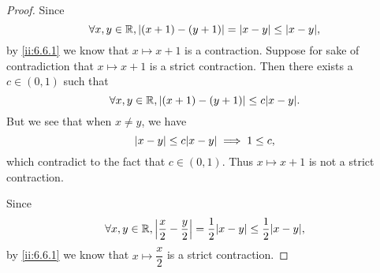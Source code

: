 \begin{proof}
  Since
  \[
    \forall x, y \in \R, \abs{(x + 1) - (y + 1)} = \abs{x - y} \leq \abs{x - y},
  \]
  by \cref{ii:6.6.1} we know that \(x \mapsto x + 1\) is a contraction.
  Suppose for sake of contradiction that \(x \mapsto x + 1\) is a strict contraction.
  Then there exists a \(c \in (0, 1)\) such that
  \[
    \forall x, y \in \R, \abs{(x + 1) - (y + 1)} \leq c \abs{x - y}.
  \]
  But we see that when \(x \neq y\), we have
  \[
    \abs{x - y} \leq c \abs{x - y} \implies 1 \leq c,
  \]
  which contradict to the fact that \(c \in (0, 1)\).
  Thus \(x \mapsto x + 1\) is not a strict contraction.

  Since
  \[
    \forall x, y \in \R, \abs{\dfrac{x}{2} - \dfrac{y}{2}} = \dfrac{1}{2} \abs{x - y} \leq \dfrac{1}{2} \abs{x - y},
  \]
  by \cref{ii:6.6.1} we know that \(x \mapsto \dfrac{x}{2}\) is a strict contraction.


\end{proof}
